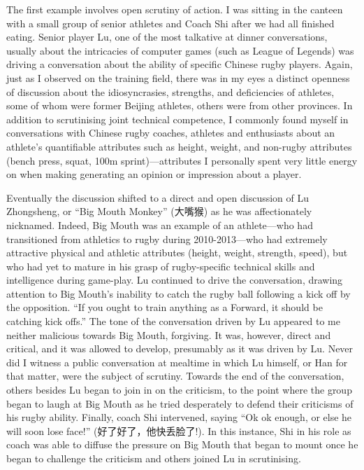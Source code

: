  The first example involves open scrutiny of action. I was sitting in the canteen with a small group of senior athletes and Coach Shi after we had all finished eating.  Senior player Lu, one of the most talkative at dinner conversations, usually about the intricacies of computer games (such as League of Legends) was driving a conversation about the ability of specific Chinese rugby players. Again, just as I observed on the training field, there was in my eyes a distinct openness of discussion about the idiosyncrasies, strengths, and deficiencies of athletes, some of whom were former Beijing athletes, others were from other provinces.  In addition to scrutinising joint technical competence, I commonly found myself in conversations with Chinese rugby coaches, athletes and enthusiasts about an athlete's quantifiable attributes such as height, weight, and non-rugby attributes (bench press, squat, 100m sprint)---attributes I personally spent very little energy on when making generating an opinion or impression about a player.

  Eventually the discussion shifted to a direct and open discussion of Lu Zhongsheng, or ``Big Mouth Monkey'' (大嘴猴) as he was affectionately nicknamed. Indeed, Big Mouth was an example of an athlete---who had transitioned from athletics to rugby during 2010-2013---who had extremely attractive physical and athletic attributes (height, weight, strength, speed), but who had yet to mature in his grasp of rugby-specific technical skills and intelligence during game-play.  Lu continued to drive the conversation, drawing attention to Big Mouth's inability to catch the rugby ball following a kick off by the opposition. ``If you ought to train anything as a Forward, it should be catching kick offs.'' The tone of the conversation driven by Lu appeared to me neither malicious towards Big Mouth, forgiving. It was, however, direct and critical, and it was allowed to develop, presumably as it was driven by Lu.  Never did I witness a public conversation at mealtime in which Lu himself, or Han for that matter, were the subject of scrutiny. Towards the end of the conversation, others besides Lu began to join in on the criticism, to the point where the group began to laugh at Big Mouth as he tried desperately to defend their criticisms of his rugby ability.
  Finally, coach Shi intervened, saying ``Ok ok enough, or else he will soon lose face!'' (好了好了，他快丢脸了!).  In this instance, Shi in his role as coach was able to diffuse the pressure on Big Mouth that began to mount once he began to challenge the criticism and others joined Lu in scrutinising.


